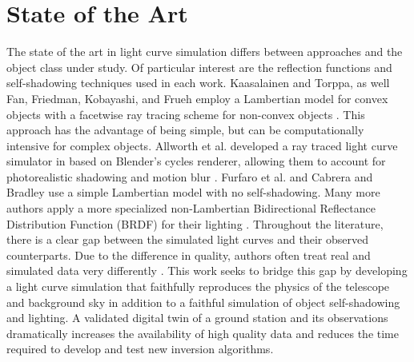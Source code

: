 \section{State of the Art}

The state of the art in light curve simulation differs between approaches and the object class under study. Of particular interest are the reflection functions and self-shadowing techniques used in each work. Kaasalainen and Torppa, as well Fan, Friedman, Kobayashi, and Frueh employ a Lambertian model for convex objects with a facetwise ray tracing scheme for non-convex objects \cite{kaasalainen2001, fan2016, fan2020thesis,friedman2020,kobayashi2020,frueh2014}. This approach has the advantage of being simple, but can be computationally intensive for complex objects. Allworth et al. developed a ray traced light curve simulator in based on Blender's cycles renderer, allowing them to account for photorealistic shadowing and motion blur \cite{allworth2020, allworth2021}. Furfaro et al. \cite{furfaro2019} and Cabrera and Bradley \cite{cabrera2021,bradley2014} use a simple Lambertian model with no self-shadowing. Many more authors apply a more specialized non-Lambertian Bidirectional Reflectance Distribution Function (BRDF) for their lighting \cite{linares2018space, mcnally2021, blacketer2022}. Throughout the literature, there is a clear gap between the simulated light curves and their observed counterparts. Due to the difference in quality, authors often treat real and simulated data very differently \cite{allworth2021}. This work seeks to bridge this gap by developing a light curve simulation that faithfully reproduces the physics of the telescope and background sky in addition to a faithful simulation of object self-shadowing and lighting. A validated digital twin of a ground station and its observations dramatically increases the availability of high quality data and reduces the time required to develop and test new inversion algorithms.

